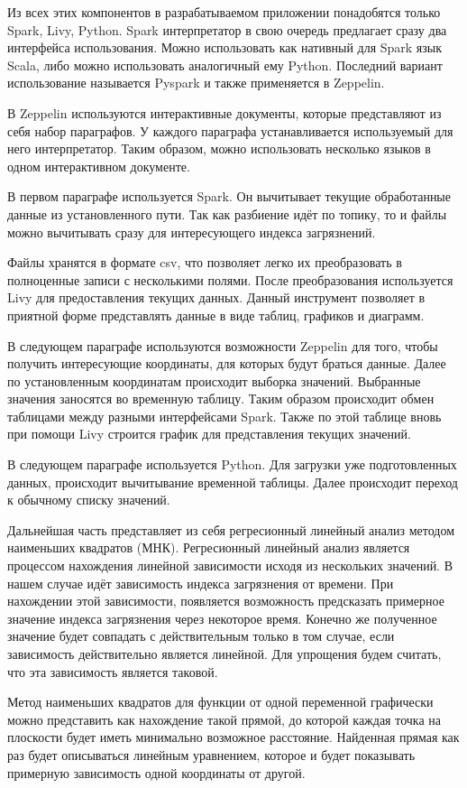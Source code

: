Из всех этих компонентов в разрабатываемом приложении понадобятся только Spark, Livy, Python.
Spark интерпретатор в свою очередь предлагает сразу два интерфейса использования.
Можно использовать как нативный для Spark язык Scala, либо можно использовать аналогичный ему Python.
Последний вариант использование называется Pyspark и также применяется в Zeppelin.

В Zeppelin используются интерактивные документы, которые представляют из себя набор параграфов.
У каждого параграфа устанавливается используемый для него интерпретатор.
Таким образом, можно использовать несколько языков в одном интерактивном документе.

В первом параграфе используется Spark. 
Он вычитывает текущие обработанные данные из установленного пути.
Так как разбиение идёт по топику, то и файлы можно вычитывать сразу для интересующего индекса загрязнений.

Файлы хранятся в формате csv, что позволяет легко их преобразовать в полноценные записи с несколькими полями.
После преобразования используется Livy для предоставления текущих данных.
Данный инструмент позволяет в приятной форме представлять данные в виде таблиц, графиков и диаграмм.

В следующем параграфе используются возможности Zeppelin для того, чтобы получить интересующие координаты, для которых будут браться данные.
Далее по установленным координатам происходит выборка значений.
Выбранные значения заносятся во временную таблицу.
Таким образом происходит обмен таблицами между разными интерфейсами Spark.
Также по этой таблице вновь при помощи Livy строится график для представления текущих значений.

В следующем параграфе используется Python.
Для загрузки уже подготовленных данных, происходит вычитывание временной таблицы.
Далее происходит переход к обычному списку значений.

Дальнейшая часть представляет из себя регресионный линейный анализ методом наименьших квадратов (МНК).
Регресионный линейный анализ является процессом нахождения линейной зависимости исходя из нескольких значений.
В нашем случае идёт зависимость индекса загрязнения от времени.
При нахождении этой зависимости, появляется возможность предсказать примерное значение индекса загрязнения через некоторое время.
Конечно же полученное значение будет совпадать с действительным только в том случае, если зависимость действительно является линейной.
Для упрощения будем считать, что эта зависимость является таковой.

Метод наименьших квадратов для функции от одной переменной графически можно представить как нахождение такой прямой, до которой каждая точка на плоскости будет иметь минимально возможное расстояние.
Найденная прямая как раз будет описываться линейным уравнением, которое и будет показывать примерную зависимость одной координаты от другой.

